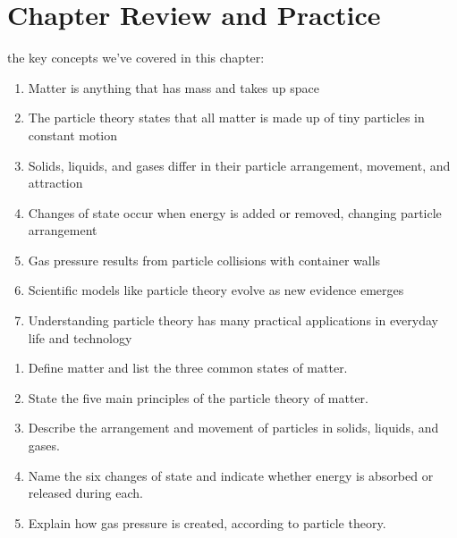 \documentclass[justified,notoc]{tufte-book}
\newenvironment{tieredquestions}[1]{%
    \begin{tcolorbox}[colback=note!30,colframe=note!50,title=\textbf{Practice Questions - #1}]
}{%
    \end{tcolorbox}
}
\begin{document}
\section{Chapter Review and Practice}

 the key concepts we've covered in this chapter:

\begin{enumerate}
    \item Matter is anything that has mass and takes up space
    \item The particle theory states that all matter is made up of tiny particles in constant motion
    \item Solids, liquids, and gases differ in their particle arrangement, movement, and attraction
    \item Changes of state occur when energy is added or removed, changing particle arrangement
    \item Gas pressure results from particle collisions with container walls
    \item Scientific models like particle theory evolve as new evidence emerges
    \item Understanding particle theory has many practical applications in everyday life and technology
\end{enumerate}

\begin{tieredquestions}{Level 1 - Basic Understanding}
\begin{enumerate}
    \item Define matter and list the three common states of matter.
    \item State the five main principles of the particle theory of matter.
    \item Describe the arrangement and movement of particles in solids, liquids, and gases.
    \item Name the six changes of state and indicate whether energy is absorbed or released during each.
    \item Explain how gas pressure is created, according to particle theory.
\end{enumerate}
\end{tieredquestions}
\end{document}
